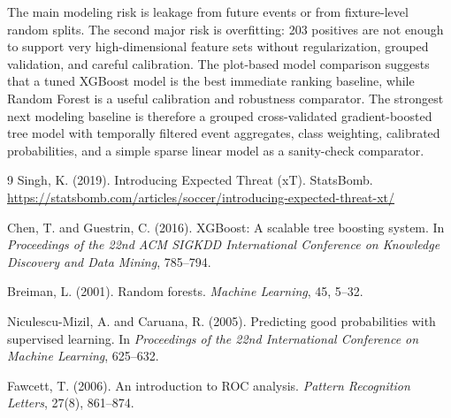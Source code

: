 \documentclass[11pt]{article}
\begin{document}
The main modeling risk is leakage from future events or from fixture-level random splits.
The second major risk is overfitting: 203 positives are not enough to support very high-dimensional feature sets without regularization, grouped validation, and careful calibration.
The plot-based model comparison suggests that a tuned XGBoost model is the best immediate ranking baseline, while Random Forest is a useful calibration and robustness comparator.
The strongest next modeling baseline is therefore a grouped cross-validated gradient-boosted tree model with temporally filtered event aggregates, class weighting, calibrated probabilities, and a simple sparse linear model as a sanity-check comparator.

\begin{thebibliography}{9}
Singh, K. (2019). Introducing Expected Threat (xT). StatsBomb.
\url{https://statsbomb.com/articles/soccer/introducing-expected-threat-xt/}

Chen, T. and Guestrin, C. (2016). XGBoost: A scalable tree boosting system.
In \emph{Proceedings of the 22nd ACM SIGKDD International Conference on Knowledge Discovery and Data Mining}, 785--794.

Breiman, L. (2001). Random forests. \emph{Machine Learning}, 45, 5--32.

Niculescu-Mizil, A. and Caruana, R. (2005). Predicting good probabilities with supervised learning.
In \emph{Proceedings of the 22nd International Conference on Machine Learning}, 625--632.

Fawcett, T. (2006). An introduction to ROC analysis. \emph{Pattern Recognition Letters}, 27(8), 861--874.
\end{thebibliography}
\end{document}
